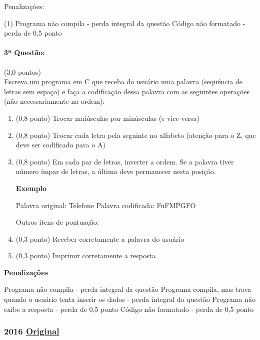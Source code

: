 \documentclass[12pt,a4paper]{article}
\newcommand{\original}[1]{\tiny \href{#1}{Original} \normalsize}
\begin{document}
Penalizações:

\begin{tasks}(1)
\task Programa não compila - perda integral da questão
\task Código não formatado - perda de 0,5 ponto
\end{tasks}

\paragraph{3ª Questão:} (3,0 pontos)\\
Escreva um programa em C que receba do usuário uma palavra (sequência de letras sem espaço) e faça a codificação dessa palavra com as seguintes operações (não necessariamente na ordem):

\begin{enumerate}[label=(\alph*)]
\item (0,8 ponto) Trocar maiúsculas por minúsculas (e vice-versa)
\item (0,8 ponto) Trocar cada letra pela seguinte no alfabeto (atenção para o Z, que deve ser codificado para o A)
\item (0,8 ponto) Em cada par de letras, inverter a ordem. Se a palavra tiver número ímpar de letras, a última deve permanecer nesta posição.

\textbf{Exemplo}

Palavra original: Telefone
Palavra codificada: FuFMPGFO

Outros itens de pontuação:

\item (0,3 ponto) Receber corretamente a palavra do usuário
\item (0,3 ponto) Imprimir corretamente a resposta


\end{enumerate}

\textbf{Penalizações}
\begin{tasks}
\task Programa não compila - perda integral da questão
\task Programa compila, mas trava quando o usuário tenta inserir os dados - perda integral da questão
\task Programa não exibe a resposta - perda de 0,5 ponto
\task Código não formatado - perda de 0,5 ponto
\end{tasks}

\newpage
\subsubsection{2016 \original{https://drive.google.com/file/d/1ODZowjTPq52PPWTXp1CpB_j-4R_SlLdA/view?usp=sharing}}
\end{document}
